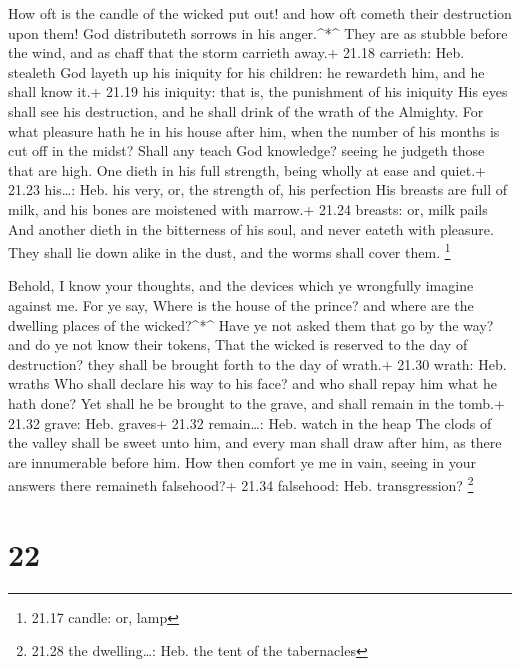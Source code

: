  How oft is the candle of the wicked put out! and how oft
cometh their destruction upon them! God distributeth sorrows in his
anger.\^{}*\^{}  They are as stubble before the wind, and
as chaff that the storm carrieth away.+ 21.18 carrieth: Heb. stealeth
 God layeth up his iniquity for his children: he rewardeth
him, and he shall know it.+ 21.19 his iniquity: that is, the punishment
of his iniquity  His eyes shall see his destruction, and he
shall drink of the wrath of the Almighty.  For what
pleasure hath he in his house after him, when the number of his months
is cut off in the midst?  Shall any teach God knowledge?
seeing he judgeth those that are high.  One dieth in his
full strength, being wholly at ease and quiet.+ 21.23 his\ldots: Heb.
his very, or, the strength of, his perfection  His breasts
are full of milk, and his bones are moistened with marrow.+ 21.24
breasts: or, milk pails  And another dieth in the
bitterness of his soul, and never eateth with pleasure. 
They shall lie down alike in the dust, and the worms shall cover them.
\footnote{21.17 candle: or, lamp}

 Behold, I know your thoughts, and the devices which ye
wrongfully imagine against me.  For ye say, Where is the
house of the prince? and where are the dwelling places of the
wicked?\^{}*\^{}  Have ye not asked them that go by the
way? and do ye not know their tokens,  That the wicked is
reserved to the day of destruction? they shall be brought forth to the
day of wrath.+ 21.30 wrath: Heb. wraths  Who shall declare
his way to his face? and who shall repay him what he hath done?
 Yet shall he be brought to the grave, and shall remain in
the tomb.+ 21.32 grave: Heb. graves+ 21.32 remain\ldots: Heb. watch in
the heap  The clods of the valley shall be sweet unto him,
and every man shall draw after him, as there are innumerable before him.
 How then comfort ye me in vain, seeing in your answers
there remaineth falsehood?+ 21.34 falsehood: Heb. transgression?
\footnote{21.28 the dwelling\ldots: Heb. the tent of the tabernacles}

\hypertarget{section-21}{%
\section{22}\label{section-21}}

